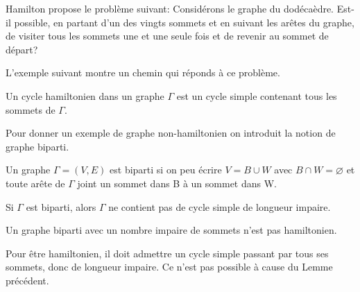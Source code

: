 Hamilton propose le problème suivant: Considérons le graphe du dodécaèdre. Est-il possible, en partant d'un des vingts sommets et en suivant les arêtes du graphe, de visiter tous les sommets une et une seule fois et de revenir au sommet de départ? 

L'exemple suivant montre un chemin qui réponds à ce problème. 

\begin{exmp}

\end{exmp}



\begin{defn}
Un cycle hamiltonien dans un graphe $\Gamma$ est un cycle simple contenant tous les sommets de $\Gamma$. 
\end{defn}

Pour donner un exemple de graphe non-hamiltonien on introduit la notion de graphe biparti. 

\begin{defn}
Un graphe $\Gamma = (V,E)$ est biparti si on peu écrire $V=B \cup W$ avec $B \cap W = \varnothing $ et toute arête de $\Gamma$ joint un sommet dans B à un sommet dans W.
\end{defn}

\begin{exmp}

\end{exmp}



\begin{lemme}
Si $\Gamma$ est biparti, alors $\Gamma$ ne contient pas de cycle simple de longueur impaire.
\end{lemme}

\begin{thrm}
Un graphe biparti avec un nombre impaire de sommets n'est pas hamiltonien.
\end{thrm}

\begin{demo}
Pour être hamiltonien, il doit admettre un cycle simple passant par tous ses sommets, donc de longueur impaire. Ce n'est pas possible à cause du Lemme précédent.
\end{demo}

\begin{exmp}

\end{exmp}


